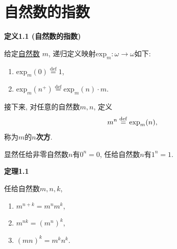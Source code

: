 \documentclass[UTF8]{ctexart}
\begin{document}
\setlength{\abovedisplayskip}{1pt}
\setlength{\belowdisplayskip}{1pt}

\section{自然数的指数}

\hypertarget{sec:定义1.1}{}
\noindent\textbf{定义1.1 (自然数的指数)}

给定\href{../01 自然数/01 自然数#nameddest=sec:定义1.3}{自然数} $m$,
递归定义映射$\mathrm{exp}_m:\omega\to\omega$如下:
\begin{enumerate}
    \item $\mathrm{exp}_m(0)\overset{\mathrm{def}}{=}1$,
    \item $\mathrm{exp}_m(n^+)\overset{\mathrm{def}}{=}\mathrm{exp}_m(n)\cdot m$.
\end{enumerate}

接下来, 对任意的自然数$m,n$, 定义
\[
    m^n\overset{\mathrm{def}}{=}\mathrm{exp}_m(n),\\[-3pt]
\]
称为$m$的$n$\textbf{次方}.

\vspace{10pt}

显然任给非零自然数$n$有$0^n=0$, 任给自然数$n$有$1^n=1$.

\vspace{10pt}

\hypertarget{sec:定理1.1}{}
\noindent\textbf{定理1.1}

任给自然数$m,n,k$,
\begin{enumerate}
    \item $m^{n+k}=m^nm^k$,
    \item $m^{nk}=(m^n)^k$,
    \item $(mn)^k=m^kn^k$.
\end{enumerate}

\end{document}
